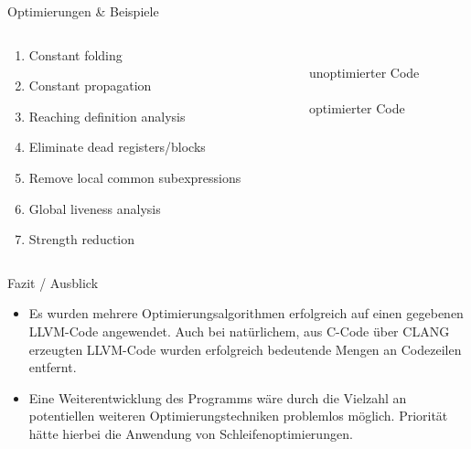 \documentclass[ucs,9pt]{beamer}
\begin{document}
\begin{frame}{Optimierungen \& Beispiele}

\begin{columns}
\begin{column}{.48\textwidth}

\begin{enumerate}
\item <+-| alert@+> Constant folding
\item <+-| alert@+> Constant propagation
\item <+-| alert@+> Reaching definition analysis
\item <+-| alert@+> Eliminate dead registers/blocks
\item <+-| alert@+> Remove local common subexpressions
\item <+-| alert@+> Global liveness analysis
\item <+-| alert@+> Strength reduction
\end{enumerate}

\end{column}%
\begin{column}{.48\textwidth}

{\\
{\color{red}unoptimierter Code}\\
\vspace*{0.3cm}
\\
{\color{green}optimierter Code}}

\end{column}%
\end{columns}

\end{frame}

\begin{frame}{Fazit / Ausblick}
\begin{itemize}
\item Es wurden mehrere Optimierungsalgorithmen erfolgreich auf einen gegebenen LLVM-Code angewendet. Auch bei natürlichem, aus C-Code über CLANG erzeugten LLVM-Code wurden erfolgreich bedeutende Mengen an Codezeilen entfernt.
\vspace{3mm}
\item Eine Weiterentwicklung des Programms wäre durch die Vielzahl an potentiellen weiteren Optimierungstechniken problemlos möglich. Priorität hätte hierbei die Anwendung von Schleifenoptimierungen.
\end{itemize}
\end{frame}
\end{document}
